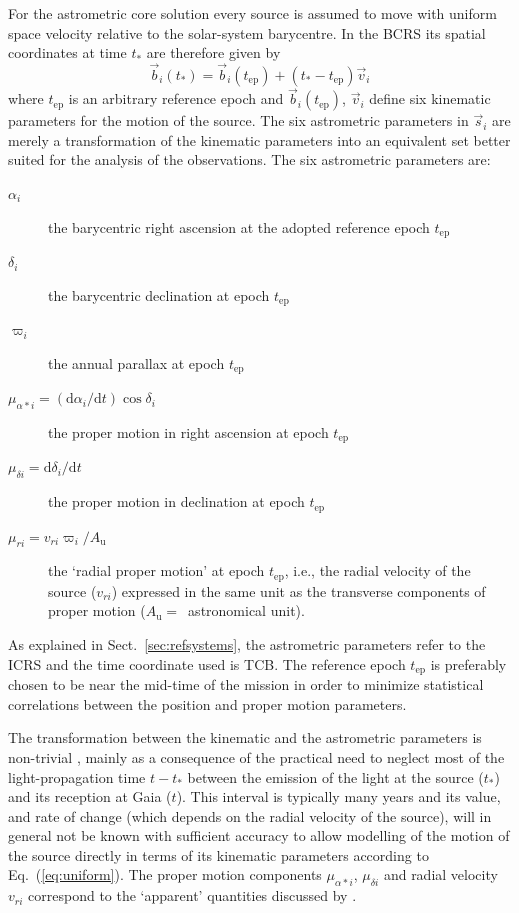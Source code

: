 \documentclass[structabstract]{aa}
\begin{document}
For the astrometric core solution every source is assumed to move with uniform
space velocity relative to the solar-system barycentre.
In the BCRS its spatial coordinates at time $t_*$ are therefore given by
\begin{equation}\label{eq:uniform}
\vec{b}_i(t_*) = \vec{b}_i(t_\text{ep}) + (t_*-t_\text{ep})\vec{v}_i
\end{equation}
where $t_\text{ep}$ is an arbitrary reference epoch and 
$\vec{b}_i(t_\text{ep})$, $\vec{v}_i$
define six kinematic parameters for the motion of the source. The six astrometric
parameters in $\vec{s}_i$ are merely a transformation of the kinematic parameters
into an equivalent set better suited for the analysis of the observations.
The six astrometric parameters are:
\begin{description}
\item[$\alpha_i$] the barycentric right ascension at the adopted 
reference epoch $t_\text{ep}$
\item[$\delta_i$] the barycentric declination at epoch $t_\text{ep}$
\item[$\varpi_{i}$] the annual parallax at epoch $t_\text{ep}$
\item[$\mu_{\alpha*i}=(\mbox{d}\alpha_i/\mbox{d}t)\cos\delta_i$] the proper motion in
right ascension at epoch $t_\text{ep}$
\item[$\mu_{\delta i}=\mbox{d}\delta_i/\mbox{d}t$] the proper motion in 
declination at epoch $t_\text{ep}$
\item[$\mu_{ri}=v_{ri}\varpi_i/A_\text{u}$] the `radial proper motion' at epoch 
$t_\text{ep}$, i.e., the radial velocity
of the source ($v_{ri}$) expressed in the same unit as the transverse components of
proper motion ($A_\text{u}=$~astronomical unit).
\end{description}
As explained in Sect.~\ref{sec:refsystems}, the astrometric parameters refer to the
ICRS and the time coordinate used is TCB. The reference epoch $t_\text{ep}$ is
preferably chosen to be near the mid-time of the mission in order to minimize
statistical correlations between the position and proper motion parameters.

The transformation between the kinematic and the astrometric parameters is
non-trivial \citep{klioner2003}, mainly as a consequence of the practical need to
neglect most of the light-propagation time $t-t_*$ between the emission of the light
at the source ($t_*$) and its reception at Gaia ($t$). This interval is typically many
years and its value, and rate of change (which depends on the radial velocity of the source),
will in general not be known with sufficient accuracy to allow modelling of the motion of
the source directly in terms of its kinematic parameters according to Eq.~(\ref{eq:uniform}).
The proper motion components
$\mu_{\alpha*i}$, $\mu_{\delta i}$ and radial velocity $v_{ri}$ correspond to the
`apparent' quantities discussed by \citet[Sect.~8]{klioner2003}.
\end{document}
